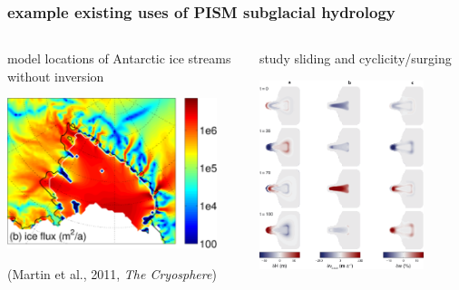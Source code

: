 \documentclass[hide notes,intlimits]{beamer}
\begin{document}
\begin{frame}
  \frametitle{example existing uses of PISM subglacial hydrology}

\begin{columns}
\begin{column}{0.5\textwidth}
\begin{center}
model locations of Antarctic ice streams without inversion

\vspace{10mm}

\includegraphics[width=0.9\textwidth]{figs/martin-fig12}

\vspace{7mm}

\medskip
\scriptsize (Martin et al., 2011, \emph{The Cryosphere})
\end{center}
\end{column}
\begin{column}{0.5\textwidth}
\begin{center}
study sliding and cyclicity/surging

\bigskip
\includegraphics[width=0.8\textwidth]{figs/vanPeltOerlemans-fig4}


\end{center}
\end{column}
\end{columns}
\end{frame}
\end{document}
